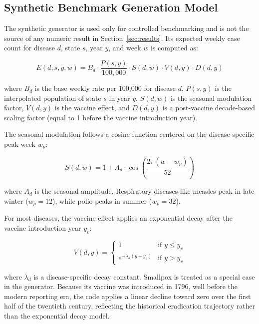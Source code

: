 \documentclass[12pt,a4paper]{article}
\begin{document}
\subsection{Synthetic Benchmark Generation Model}

The synthetic generator is used only for controlled benchmarking and is not the source of any numeric result in Section~\ref{sec:results}. Its expected weekly case count for disease $d$, state $s$, year $y$, and week $w$ is computed as:

\begin{equation}
\label{eq:expected}
E(d, s, y, w) = B_d \cdot \frac{P(s, y)}{100{,}000} \cdot S(d, w) \cdot V(d, y) \cdot D(d, y)
\end{equation}

where $B_d$ is the base weekly rate per 100,000 for disease $d$, $P(s, y)$ is the interpolated population of state $s$ in year $y$, $S(d, w)$ is the seasonal modulation factor, $V(d, y)$ is the vaccine effect, and $D(d, y)$ is a post-vaccine decade-based scaling factor (equal to 1 before the vaccine introduction year).

The seasonal modulation follows a cosine function centered on the disease-specific peak week $w_p$:

\begin{equation}
S(d, w) = 1 + A_d \cdot \cos\!\left(\frac{2\pi(w - w_p)}{52}\right)
\end{equation}

where $A_d$ is the seasonal amplitude. Respiratory diseases like measles peak in late winter ($w_p = 12$), while polio peaks in summer ($w_p = 32$).

For most diseases, the vaccine effect applies an exponential decay after the vaccine introduction year $y_v$:

\begin{equation}
V(d, y) = \begin{cases} 1 & \text{if } y \leq y_v \\ e^{-\lambda_d (y - y_v)} & \text{if } y > y_v \end{cases}
\end{equation}

where $\lambda_d$ is a disease-specific decay constant. Smallpox is treated as a special case in the generator. Because its vaccine was introduced in 1796, well before the modern reporting era, the code applies a linear decline toward zero over the first half of the twentieth century, reflecting the historical eradication trajectory rather than the exponential decay model.
\end{document}
